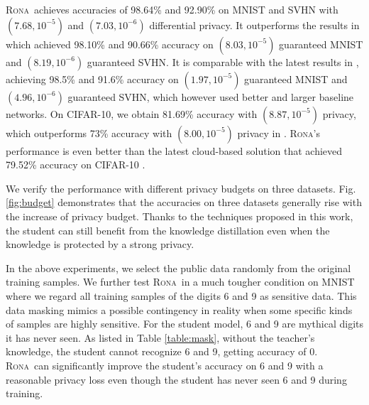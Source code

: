\documentclass[letterpaper]{article} %
\newcommand*\system{\textsc{Rona}}
\begin{document}
\system\ achieves accuracies of 98.64\% and 92.90\% on MNIST and SVHN with $(7.68,10^{-5})$ and $(7.03,10^{-6})$ differential privacy. It outperforms the results in \cite{papernot2017semi} which achieved 98.10\% and 90.66\% accuracy on $(8.03,10^{-5})$ guaranteed MNIST and $(8.19,10^{-6})$ guaranteed SVHN. It is comparable with the latest results in \cite{papernot2018scalable}, achieving 98.5\% and 91.6\% accuracy on $(1.97,10^{-5})$ guaranteed MNIST and $(4.96,10^{-6})$ guaranteed SVHN, which however used better and larger baseline networks. On CIFAR-10, we obtain 81.69\% accuracy with $(8.87,10^{-5})$ privacy, which outperforms 73\% accuracy with $(8.00,10^{-5})$ privacy in \cite{abadi2016deep}. \system's performance is even better than the latest cloud-based solution that achieved 79.52\% accuracy on CIFAR-10 \cite{wang2018not}.

We verify the performance with different privacy budgets on three datasets. Fig. \ref{fig:budget} demonstrates that the accuracies on three datasets generally rise with the increase of privacy budget. Thanks to the techniques proposed in this work, the student can still benefit from the knowledge distillation even when the knowledge is protected by a strong privacy.

In the above experiments, we select the public data randomly from the original training samples. We further test \system\ in a much tougher condition on MNIST where we regard all training samples of the digits 6 and 9 as sensitive data. This data masking mimics a possible contingency in reality when some specific kinds of samples are highly sensitive. For the student model, 6 and 9 are mythical digits it has never seen. As listed in Table \ref{table:mask}, without the teacher's knowledge, the student cannot recognize 6 and 9, getting accuracy of 0. \system\ can significantly improve the student's accuracy on 6 and 9 with a reasonable privacy loss even though the student has never seen 6 and 9 during training.
\end{document}
